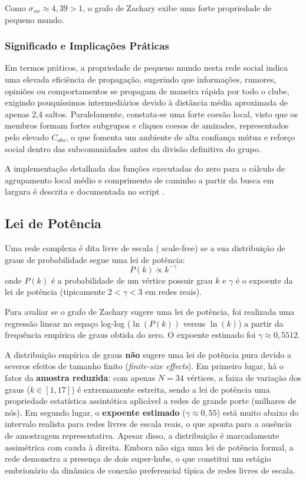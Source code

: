 \documentclass[sigconf,nonacm]{webmedia}
\begin{document}
Como $\sigma_{sw} \approx 4,39 > 1$, o grafo de Zachary exibe uma forte propriedade de pequeno mundo.

\subsubsection{Significado e Implicações Práticas}
Em termos práticos, a propriedade de pequeno mundo nesta rede social indica uma elevada eficiência de propagação, sugerindo que informações, rumores, opiniões ou comportamentos se propagam de maneira rápida por todo o clube, exigindo pouquíssimos intermediários devido à distância média aproximada de apenas 2,4 saltos. Paralelamente, constata-se uma forte coesão local, visto que os membros formam fortes subgrupos e cliques coesos de amizades, representados pelo elevado $C_{obs}$, o que fomenta um ambiente de alta confiança mútua e reforço social dentro das subcomunidades antes da divisão definitiva do grupo.

A implementação detalhada das funções executadas do zero para o cálculo de agrupamento local médio e comprimento de caminho a partir da busca em largura é descrita e documentada no script .

\subsection{Lei de Potência}
\label{subsec:power_law}

Uma rede complexa é dita livre de escala ( {scale-free}) se a sua distribuição de graus de probabilidade segue uma lei de potência:
\begin{equation}
    P(k) \propto k^{-\gamma}
\end{equation}
onde $P(k)$ é a probabilidade de um vértice possuir grau $k$ e $\gamma$ é o expoente da lei de potência (tipicamente $2 < \gamma < 3$ em redes reais).

Para avaliar se o grafo de Zachary sugere uma lei de potência, foi realizada uma regressão linear no espaço log-log ($\ln(P(k))$ versus $\ln(k)$) a partir da frequência empírica de graus obtida do zero. O expoente estimado foi $\gamma \approx 0,5512$.

A distribuição empírica de graus \textbf{não} sugere uma lei de potência pura devido a severos efeitos de tamanho finito (\textit{finite-size effects}). Em primeiro lugar, há o fator da \textbf{amostra reduzida}: com apenas $N=34$ vértices, a faixa de variação dos graus ($k \in [1, 17]$) é extremamente estreita, sendo a lei de potência uma propriedade estatística assintótica aplicável a redes de grande porte (milhares de nós). Em segundo lugar, o \textbf{expoente estimado} ($\gamma \approx 0,55$) está muito abaixo do intervalo realista para redes livres de escala reais, o que aponta para a ausência de amostragem representativa.
Apesar disso, a distribuição é marcadamente assimétrica com cauda à direita. Embora não siga uma lei de potência formal, a rede demonstra a presença de dois super-hubs, o que constitui um estágio embrionário da dinâmica de conexão preferencial típica de redes livres de escala.
\end{document}
